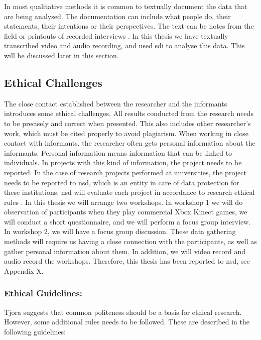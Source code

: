 In most qualitative methods it is common to textually document the data that are being analysed. The documentation can include what people do, their statements, their intentions or their perspectives. The text can be notes from the field or printouts of  recorded interviews \cite{qualitative}. In this thesis we have textually transcribed video and audio recording, and used \ac{sdi} to analyse this data. This will be discussed later in this section.

\subsection{Ethical Challenges}
The close contact established between the researcher and the informants introduces some ethical challenges. All results conducted from the research needs to be precisely and correct when presented. This also includes other researcher's work, which must be cited properly to avoid plagiarism. When working in close contact with informants, the researcher often gets personal information about the informants. Personal information means information that can be linked to individuals. In projects with this kind of information, the project needs to be reported. In the case of research projects performed at universities, the project needs to be reported to \ac{nsd}, which is an entity in care of data protection for these institutions. \ac{nsd} will evaluate each project in accordance to research ethical rules \cite{qualitative}. In this thesis we will arrange two workshops. In workshop 1 we will do observation of participants when they play commercial Xbox Kinect games, we will conduct a short questionnaire, and we will perform a focus group interview. In workshop 2, we will have a focus group discussion. These data gathering methods will require us having a close connection with the participants, as well as gather personal information about them. In addition, we will video record and audio record the workshops. Therefore, this thesis has been reported to \ac{nsd}, see Appendix X. 

\subsubsection{Ethical Guidelines:}
Tjora \cite{tjora} suggests that common politeness should be a basis for ethical research. However, some additional rules needs to be followed. These are described in the following guidelines:

